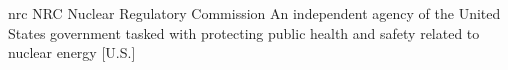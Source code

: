 \newglsXgovernment%
{nrc}%
{NRC}%
{Nuclear Regulatory Commission}%
{An independent agency of the United States government tasked with protecting public health and safety related to nuclear energy \cite{website:Nuclear_Regulatory_Commission}}%
[U.S.]%
